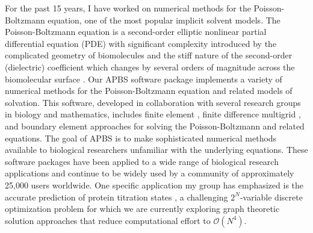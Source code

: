 \documentclass[11pt]{amsart}
\begin{document}
For the past 15 years, I have worked on numerical methods for the Poisson-Boltzmann equation, one of the most popular implicit solvent models.  
The Poisson-Boltzmann equation is a second-order elliptic nonlinear partial differential equation (PDE) with significant complexity introduced by the complicated geometry of biomolecules and the stiff nature of the second-order (dielectric) coefficient which changes by several orders of magnitude across the biomolecular surface \cite{Ren2012}.
Our APBS software package \cite{APBS} implements a variety of numerical methods for the Poisson-Boltzmann equation and related models of solvation. 
This software, developed in collaboration with several research groups in biology and mathematics, includes finite element \cite{Holst2000, Baker2000, Baker2001a}, finite difference multigrid \cite{Baker2001b}, and boundary element approaches for solving the Poisson-Boltzmann and related equations.
The goal of APBS is to make sophisticated numerical methods available to biological researchers unfamiliar with the underlying equations.
These software packages have been applied to a wide range of biological research applications and continue to be widely used by a community of approximately 25,000 users worldwide.
One specific application my group has emphasized is the accurate prediction of protein titration states \cite{Carstensen2011, Gosink2014}, a challenging $2^N$-variable discrete optimization problem for which we are currently exploring graph theoretic solution approaches that reduce computational effort to ${\mathcal{O}}\left( N^4 \right)$.
\end{document}
